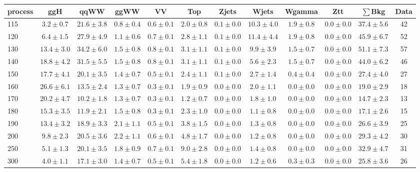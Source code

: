 \begin{table}
{\footnotesize
 \begin{center}
 \begin{tabular}{l c c c c c c c c c c c }
 \hline
 process & ggH & qqWW & ggWW & VV & Top & Zjets & Wjets & Wgamma & Ztt & $\sum$Bkg & Data \\
 \hline
115 & $3.2\pm0.7$ & $21.6\pm3.8$ & $0.8\pm0.4$ & $0.6\pm0.1$ & $2.0\pm0.8$ & $0.1\pm0.0$ & $10.3\pm4.0$ & $1.9\pm0.8$ & $0.0\pm0.0$ & $37.4\pm5.6$ & 42 \\
120 & $6.4\pm1.5$ & $27.9\pm4.9$ & $1.1\pm0.6$ & $0.7\pm0.1$ & $2.8\pm1.1$ & $0.1\pm0.0$ & $11.4\pm4.4$ & $1.9\pm0.8$ & $0.0\pm0.0$ & $45.9\pm6.7$ & 52 \\
130 & $13.4\pm3.0$ & $34.2\pm6.0$ & $1.5\pm0.8$ & $0.8\pm0.1$ & $3.1\pm1.1$ & $0.1\pm0.0$ & $9.9\pm3.9$ & $1.5\pm0.7$ & $0.0\pm0.0$ & $51.1\pm7.3$ & 57 \\
140 & $18.8\pm4.2$ & $31.5\pm5.5$ & $1.5\pm0.8$ & $0.8\pm0.1$ & $3.1\pm1.1$ & $0.1\pm0.0$ & $5.6\pm2.3$ & $1.5\pm0.7$ & $0.0\pm0.0$ & $44.0\pm6.2$ & 46 \\
150 & $17.7\pm4.1$ & $20.1\pm3.5$ & $1.4\pm0.7$ & $0.5\pm0.1$ & $2.4\pm1.1$ & $0.1\pm0.0$ & $2.7\pm1.4$ & $0.4\pm0.4$ & $0.0\pm0.0$ & $27.4\pm4.0$ & 27 \\
160 & $26.6\pm6.1$ & $13.5\pm2.4$ & $1.3\pm0.7$ & $0.3\pm0.1$ & $1.9\pm0.9$ & $0.0\pm0.0$ & $2.0\pm1.1$ & $0.0\pm0.0$ & $0.0\pm0.0$ & $19.0\pm2.9$ & 18 \\
170 & $20.2\pm4.7$ & $10.2\pm1.8$ & $1.3\pm0.7$ & $0.3\pm0.1$ & $1.2\pm0.7$ & $0.0\pm0.0$ & $1.8\pm1.0$ & $0.0\pm0.0$ & $0.0\pm0.0$ & $14.7\pm2.3$ & 13 \\
180 & $15.3\pm3.5$ & $11.9\pm2.1$ & $1.5\pm0.8$ & $0.3\pm0.1$ & $2.3\pm1.0$ & $0.0\pm0.0$ & $1.1\pm0.8$ & $0.0\pm0.0$ & $0.0\pm0.0$ & $17.1\pm2.6$ & 15 \\
190 & $13.4\pm3.2$ & $18.9\pm3.3$ & $2.1\pm1.1$ & $0.5\pm0.1$ & $3.8\pm1.5$ & $0.0\pm0.0$ & $1.3\pm0.8$ & $0.0\pm0.0$ & $0.0\pm0.0$ & $26.6\pm3.9$ & 25 \\
200 & $9.8\pm2.3$ & $20.5\pm3.6$ & $2.2\pm1.1$ & $0.6\pm0.1$ & $4.8\pm1.7$ & $0.0\pm0.0$ & $1.2\pm0.8$ & $0.0\pm0.0$ & $0.0\pm0.0$ & $29.3\pm4.2$ & 30 \\
250 & $5.1\pm1.3$ & $20.1\pm3.5$ & $1.8\pm0.9$ & $0.7\pm0.1$ & $9.0\pm2.8$ & $0.0\pm0.0$ & $1.4\pm0.8$ & $0.0\pm0.0$ & $0.0\pm0.0$ & $32.9\pm4.7$ & 31 \\
300 & $4.0\pm1.1$ & $17.1\pm3.0$ & $1.4\pm0.7$ & $0.5\pm0.1$ & $5.4\pm1.8$ & $0.0\pm0.0$ & $1.2\pm0.6$ & $0.3\pm0.3$ & $0.0\pm0.0$ & $25.8\pm3.6$ & 26 \\

\end{tabular}
\end{center}}
\end{table}
